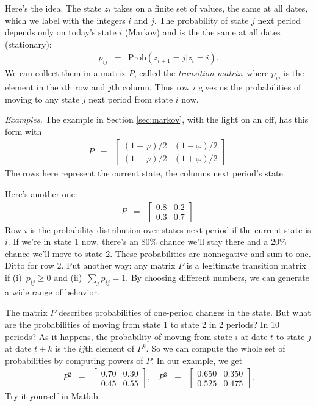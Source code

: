 \documentclass[11pt]{article}
\begin{document}
Here's the idea.
The state $z_t$ takes on a finite set of values, the same at all dates,
which we label with the integers $i$ and $j$.
The probability of state $j$ next period depends only on today's state $i$
(Markov) and is the the same at all dates (stationary):
\begin{eqnarray*}
    p_{ij} &=& \mbox{Prob} (z_{t+1} = j | z_t = i) .
\end{eqnarray*}
We can collect them in a matrix $P$, called the {\it transition matrix\/},
where $p_{ij}$ is the element in the $i$th row and $j$th column.
Thus  row $i$ gives us the probabilities of moving to any state $j$
next period from state $i$ now.

{\it Examples.\/}
The example in Section \ref{sec:markov},
with the light on an off, has this form with
\begin{eqnarray*}
    P &=& \left[
            \begin{array}{cc}
            (1+\varphi)/2 & (1-\varphi)/2 \\  (1-\varphi)/2 & (1+\varphi)/2
            \end{array}
            \right] .
\end{eqnarray*}
The rows here represent the current state, the columns next period's state.

Here's another one:
\begin{eqnarray*}
    P &=& \left[
            \begin{array}{cc}
            0.8 & 0.2 \\  0.3 & 0.7
            \end{array}
            \right] .
\end{eqnarray*}
Row $i$ is the probability distribution over states next period
if the current state is $i$.
If we're in state 1 now, there's an 80\% chance we'll stay there
and a 20\% chance we'll move to state 2.
These probabilities are nonnegative and sum to one.
Ditto for row 2.
Put another way:  any matrix $P$ is a legitimate transition matrix
if (i)~$p_{ij} \geq 0$ and (ii)~$\sum_j p_{ij} = 1$.
By choosing different numbers, we can generate a wide range of behavior.


The matrix $P$ describes probabilities of one-period changes in the state.
But what are the probabilities of moving from state 1 to state 2 in 2 periods?
In 10 periods?
As it happens, the probability of moving from state $i$ at date $t$ to state $j$
at date $t+k$ is the $ij$th element of $P^k$.
So we can compute the whole set of probabilities by computing powers of $P$.
In our example, we get
\begin{eqnarray*}
    P^2 &=& \left[
            \begin{array}{cc}
            0.70 & 0.30 \\  0.45 & 0.55
            \end{array}
            \right] , \;\;\;
    P^3 \;\;=\;\; \left[
            \begin{array}{cc}
            0.650 & 0.350 \\  0.525 & 0.475
            \end{array}
            \right] .
\end{eqnarray*}
Try it yourself in Matlab.
\end{document}
